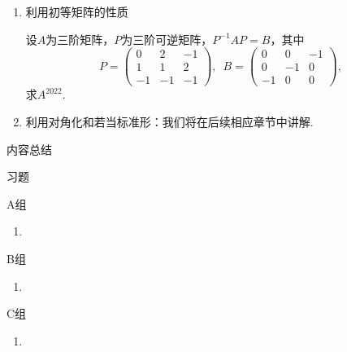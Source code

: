\begin{enumerate}
    \begin{proof}
        
    \end{proof}

    \begin{example}
        已知数列$\{a_n\},\enspace\{b_n\}$满足$a_0=-1,\enspace b_0=3$，且
        \[\begin{cases}
            a_n=3a_{n-1}+b_{n-1}+2^{n-1} \\ b_n=2a_{n-1}+4b_{n-1}+2^n
        \end{cases}\]
        求$\{a_n\}\enspace\{b_n\}$的通项公式.
    \end{example}
    \begin{solution}

    \end{solution}

    \item 利用初等矩阵的性质
    \begin{example}
        设$A$为三阶矩阵，$P$为三阶可逆矩阵，$P^{-1}AP=B$，其中
        \[P=\begin{pmatrix}
            0 & 2 & -1 \\ 1 & 1 & 2 \\ -1 & -1 & -1
        \end{pmatrix},\enspace B=\begin{pmatrix}
            0 & 0 & -1 \\ 0 & -1 & 0 \\ -1 & 0 & 0
        \end{pmatrix},\]
        求$A^{2022}$.
    \end{example}
    \begin{solution}

    \end{solution}

    \item 利用对角化和若当标准形：我们将在后续相应章节中讲解.
\end{enumerate}

\vspace{2ex}
\centerline{\heiti \Large 内容总结}

\vspace{2ex}

\centerline{\heiti \Large 习题}
\vspace{2ex}
{\kaishu }
\begin{flushright}
    \kaishu

\end{flushright}
\centerline{\heiti A组}
\begin{enumerate}
    \item
\end{enumerate}
\centerline{\heiti B组}
\begin{enumerate}
    \item
\end{enumerate}
\centerline{\heiti C组}
\begin{enumerate}
    \item
\end{enumerate}
